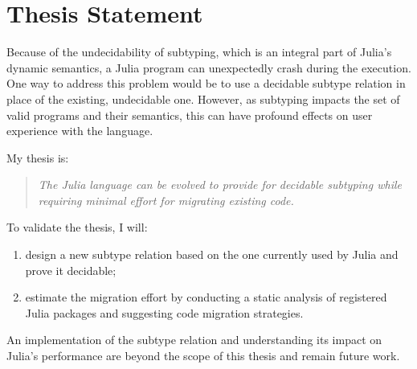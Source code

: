 \chapter{Thesis Statement}\label{chap:3}

Because of the undecidability of subtyping, which is an integral part of Julia's
dynamic semantics, a Julia program can
unexpectedly crash during the execution.
One way to address this problem would be to use a decidable subtype relation
in place of the existing, undecidable one.
However, as subtyping impacts the set of valid programs and their semantics,
this can have profound effects on user experience with the language.

My thesis is:
\begin{quotation}\emph{
  The Julia language can be evolved to provide for decidable subtyping while
  requiring minimal effort for migrating existing code.
}\end{quotation}

To validate the thesis, I will:
\begin{enumerate}
  \item design a new subtype relation based on the one currently used by Julia
    and prove it decidable;
  \item estimate the migration effort by conducting a static analysis of
    registered Julia packages and suggesting code migration strategies.
\end{enumerate}


An implementation of the subtype relation and understanding its impact on
Julia's performance are beyond the scope of this thesis and
remain future work.


